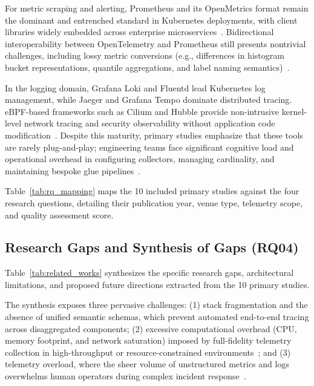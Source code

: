 \documentclass[sigconf, anonymous, balance=false]{acmart}
\begin{document}
For metric scraping and alerting, Prometheus and its OpenMetrics format remain the dominant and entrenched standard in Kubernetes deployments, with client libraries widely embedded across enterprise microservices~\cite{usman_2022, faseeha_2025}. Bidirectional interoperability between OpenTelemetry and Prometheus still presents nontrivial challenges, including lossy metric conversions (e.g., differences in histogram bucket representations, quantile aggregations, and label naming semantics)~\cite{hartikainen_2024}. 

In the logging domain, Grafana Loki and Fluentd lead Kubernetes log management, while Jaeger and Grafana Tempo dominate distributed tracing. eBPF-based frameworks such as Cilium and Hubble provide non-intrusive kernel-level network tracing and security observability without application code modification~\cite{faseeha_2025}. Despite this maturity, primary studies emphasize that these tools are rarely plug-and-play; engineering teams face significant cognitive load and operational overhead in configuring collectors, managing cardinality, and maintaining bespoke glue pipelines~\cite{kosinska_2023, usman_2022}.



Table~\ref{tab:rq_mapping} maps the 10 included primary studies against the four research questions, detailing their publication year, venue type, telemetry scope, and quality assessment score.

\subsection{Research Gaps and Synthesis of Gaps (RQ04)}
Table~\ref{tab:related_works} synthesizes the specific research gaps, architectural limitations, and proposed future directions extracted from the 10 primary studies.





The synthesis exposes three pervasive challenges: (1) stack fragmentation and the absence of unified semantic schemas, which prevent automated end-to-end tracing across disaggregated components; (2) excessive computational overhead (CPU, memory footprint, and network saturation) imposed by full-fidelity telemetry collection in high-throughput or resource-constrained environments~\cite{zanatta_23, araujo_24}; and (3) telemetry overload, where the sheer volume of unstructured metrics and logs overwhelms human operators during complex incident response~\cite{han_2024, deng_2024}.
\end{document}
